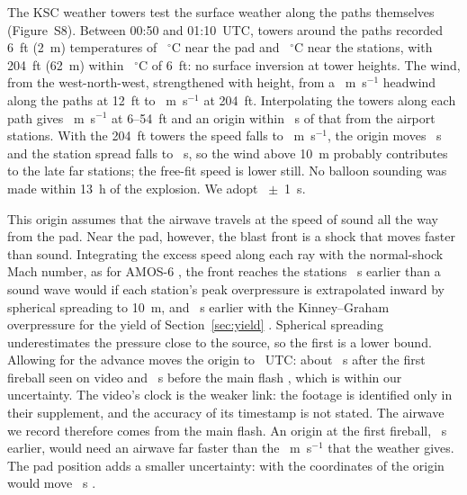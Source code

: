\documentclass[]{seismica}
\newcommand{\suppfig}[1]{Figure~S#1}
\begin{document}
The KSC weather towers \citep{ksc_wxarchive} test the surface weather
along the paths themselves (\suppfig{8}). Between 00:50 and 01:10~UTC,
\NGtowerN{} towers around the paths recorded 6~ft (2~m)
temperatures of \NGtowerTcoast~$^{\circ}$C near the pad and
\NGtowerTinland~$^{\circ}$C near the stations, with 204~ft (62~m) within
\NGtowerDTmax~$^{\circ}$C of 6~ft: no surface inversion at tower heights. The
wind, from the west-north-west, strengthened with height, from a
\NGtowerHeadLow~m~s$^{-1}$ headwind along the paths at 12~ft to
\NGtowerHeadHigh~m~s$^{-1}$ at 204~ft. Interpolating the towers along each path
gives \NGtowerCpathLow~m~s$^{-1}$ at 6--54~ft and an origin within
\NGtowerShiftLow~s of that from the airport stations. With the 204~ft towers
the speed falls to \NGtowerCpathHigh~m~s$^{-1}$, the origin moves
\NGtowerShiftHigh~s \NGtowerShiftHighDir{} and the station spread falls to
\NGtowerSpreadHigh~s, so the wind above 10~m probably contributes to the late
far stations; the free-fit speed is lower still. No balloon sounding was
made within 13~h of the explosion. We adopt \NGorigin~$\pm$~1~s.

This origin assumes that the airwave travels at the speed of sound all
the way from the pad. Near the pad, however, the blast front is a shock
that moves faster than sound. Integrating the excess speed along each
ray with the normal-shock Mach number, as for AMOS-6
\citep{thompson_amos6_2026}, the front reaches the stations
\NGadvanceSph~s earlier than a sound wave would if each station's peak
overpressure is extrapolated inward by spherical spreading to 10~m, and
\NGadvance~s earlier with the Kinney--Graham overpressure for the yield of
Section~\ref{sec:yield} \citep{kinney1985}. Spherical spreading
underestimates the pressure close to the source, so the first is a lower
bound. Allowing for the advance moves the origin to
\NGoriginCorrRange~UTC: about \NGfireballGap~s after the first fireball seen on
video and \NGflashGapRange~s before the main flash
\citep{silber_scamfer_newglenn_2026}, which is within our uncertainty.
The video's clock is the weaker link: the footage is identified only in
their supplement, and the accuracy of its timestamp is not stated.
The airwave we record therefore comes from the main flash. An origin at
the first fireball, \NGflashFireballSep~s earlier, would need an airwave far
faster than the \NGceff~m~s$^{-1}$ that the weather gives. The pad position
adds a smaller uncertainty: with the coordinates of
\citet{silber_scamfer_newglenn_2026} the origin would move \NGpadShift~s
\NGpadShiftDir.
\end{document}
